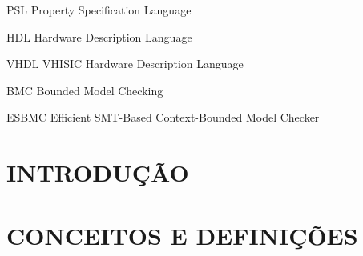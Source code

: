 \documentclass[
	12pt,				%
    oneside,			%
	a4paper,			%
	chapter=TITLE,		%
	english,			%
	brazil				%
	]{abntex2}
\begin{document}
\listoftables*
\cleardoublepage

\begin{siglas}
  \item[PSL] Property Specification Language
  \item[HDL] Hardware Description Language
  \item[VHDL] VHISIC Hardware Description Language
  \item[BMC] Bounded Model Checking
  \item[ESBMC] Efficient SMT-Based Context-Bounded Model Checker
\end{siglas}


\tableofcontents*
\cleardoublepage



\textual
\chapter{INTRODUÇÃO}


\chapter{CONCEITOS E DEFINIÇÕES}


\end{document}
